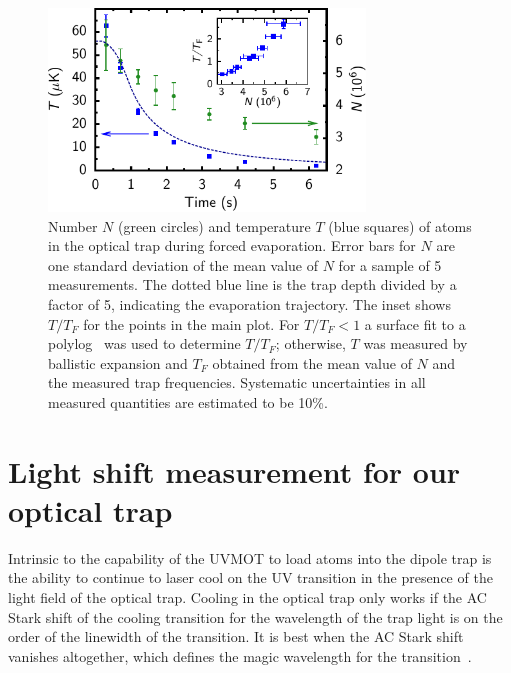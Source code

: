 \documentclass[oneside,12pt]{memoir}
\begin{document}
\begin{figure} \centering
\includegraphics[width=0.75\textwidth]{../figures/evaporation-simple-01/evapeps.pdf}
\caption[Forced evaporation to quantum degeneracy]{\small Number $N$ (green
circles) and temperature $T$ (blue squares) of atoms in the optical trap during
forced evaporation. Error bars for $N$ are one standard deviation of the mean
value of $N$ for a sample of 5 measurements.  The dotted blue line is the trap
depth  divided by a factor of 5, indicating the evaporation trajectory. The
inset shows $T/T_F$ for the points in the main plot.  For $T/T_F<1$ a surface
fit to a polylog~\cite{Butts1997, DeMarco2001, Making2007} was used to determine $T/T_F$;
otherwise, $T$ was measured by ballistic expansion and $T_F$ obtained from the
mean value of $N$ and the measured trap frequencies.  Systematic uncertainties
in all measured quantities are estimated to be 10\%.} \label{fig:evap}
\end{figure} 

\section{Light shift measurement for our optical trap}
\label{sec:lightshift}

Intrinsic to the capability of the UVMOT to load atoms into the dipole trap is
the ability to continue to laser cool on the UV transition in the presence of
the light field of the optical trap.   Cooling in the optical trap only works
if the AC Stark shift of the cooling transition for the wavelength of the trap
light is on the order of the linewidth of the transition.  It is best when the
AC Stark shift vanishes altogether, which defines the magic wavelength for the
transition~\cite{Katori2003}. 
\end{document}
